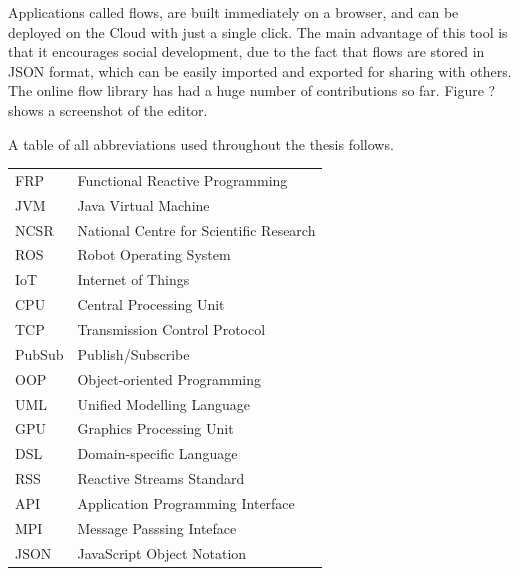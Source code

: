 \documentclass{dithesis}
\begin{document}
Applications called flows, are built immediately on a browser, and can be deployed on the Cloud with just a single click. The main advantage of this tool is that it encourages social development, due to the fact that flows are stored in JSON format, which can be easily imported and exported for sharing with others. The online flow library has had a huge number of contributions so far. Figure ? shows a screenshot of the editor.





\begin{thesisabbreviations}
A table of all abbreviations used throughout the thesis follows.

\begin{tabularx}{\textwidth}{|X|X|}
  \hline
  FRP & Functional Reactive Programming \\
  JVM & Java Virtual Machine \\
  NCSR & National Centre for Scientific Research \\
  ROS & Robot Operating System \\
  IoT & Internet of Things \\
  CPU & Central Processing Unit \\
  TCP & Transmission Control Protocol \\
  PubSub & Publish/Subscribe \\
  OOP & Object-oriented Programming \\
  UML & Unified Modelling Language \\
  GPU & Graphics Processing Unit \\
  DSL & Domain-specific Language \\
  RSS & Reactive Streams Standard \\
  API & Application Programming Interface \\
  MPI & Message Passsing Inteface \\
  JSON & JavaScript Object Notation \\
  \hline
\end{tabularx}

\end{thesisabbreviations}

\newpage

{}
\end{document}

